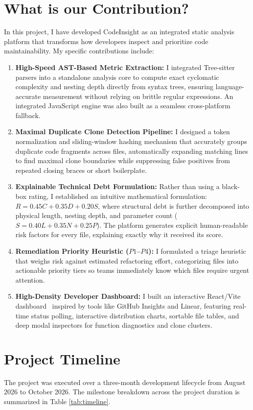 \section{What is our Contribution?}
In this project, I have developed CodeInsight as an integrated static analysis platform that transforms how developers inspect and prioritize code maintainability. My specific contributions include:
\begin{enumerate}
    \item \textbf{High-Speed AST-Based Metric Extraction:} I integrated Tree-sitter parsers into a standalone analysis core to compute exact cyclomatic complexity and nesting depth directly from syntax trees, ensuring language-accurate measurement without relying on brittle regular expressions. An integrated JavaScript engine was also built as a seamless cross-platform fallback.
    \item \textbf{Maximal Duplicate Clone Detection Pipeline:} I designed a token normalization and sliding-window hashing mechanism that accurately groups duplicate code fragments across files, automatically expanding matching lines to find maximal clone boundaries while suppressing false positives from repeated closing braces or short boilerplate.
    \item \textbf{Explainable Technical Debt Formulation:} Rather than using a black-box rating, I established an intuitive mathematical formulation: $R = 0.45C + 0.35D + 0.20S$, where structural debt is further decomposed into physical length, nesting depth, and parameter count ($S = 0.40L + 0.35N + 0.25P$). The platform generates explicit human-readable risk factors for every file, explaining exactly why it received its score.
    \item \textbf{Remediation Priority Heuristic ($P1$--$P4$):} I formulated a triage heuristic that weighs risk against estimated refactoring effort, categorizing files into actionable priority tiers so teams immediately know which files require urgent attention.
    \item \textbf{High-Density Developer Dashboard:} I built an interactive React/Vite dashboard~\cite{vite} inspired by tools like GitHub Insights and Linear, featuring real-time status polling, interactive distribution charts, sortable file tables, and deep modal inspectors for function diagnostics and clone clusters.
\end{enumerate}

\clearpage
\section{Project Timeline}
The project was executed over a three-month development lifecycle from August 2026 to October 2026. The milestone breakdown across the project duration is summarized in Table \ref{tab:timeline}.


